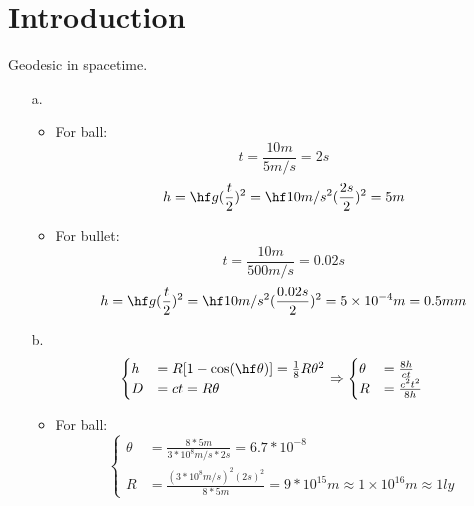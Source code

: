 \documentclass[11pt,fleqn]{book} %
\begin{document}
\chapter{Introduction}

\begin{problem}
	Geodesic in spacetime.\\
	\begin{enumerate}
		\item[a.] 
		\begin{itemize}
			\item For ball:
			\begin{equation}
				t = \frac{10m}{5m/s} = 2s
			\end{equation}
		\begin{equation}
			h = \hf g (\frac{t}{2})^2 = \hf 10m/s^2 (\frac{2s}{2})^2 = 5m
		\end{equation}
	
	\item For bullet:
	\begin{equation}
		t = \frac{10m}{500m/s} = 0.02s
	\end{equation}
	\begin{equation}
		h = \hf g (\frac{t}{2})^2 = \hf 10m/s^2 (\frac{0.02s}{2})^2 = 5\times 10^{-4}m = 0.5 mm
	\end{equation}
	
		\end{itemize}
	
		\item[b.] 
	\begin{equation}
		\begin{cases}
			h &= R [1 - \cos(\hf \theta)] = \frac{1}{8} R \theta^2 \\
			D &= c t = R \theta 
		\end{cases}
	\Rightarrow
	\begin{cases}
		\theta &= \frac{8h}{ct} \\
		R &= \frac{c^2 t^2}{8h} 
	\end{cases}
	\end{equation}
\begin{itemize}
	\item For ball:
	\begin{equation}
		\begin{cases}
			\theta &= \frac{8*5m}{3*10^8 m/s *2s} =  6.7*10^{-8}\\
			R &= \frac{(3*10^8 m/s)^2 (2s)^2}{8*5m} = 9*10^{15} m \approx 1\times 10^{16}m \approx 1 ly
		\end{cases}
	\end{equation}
	

\end{itemize}
\end{enumerate}
\end{problem}
\end{document}
